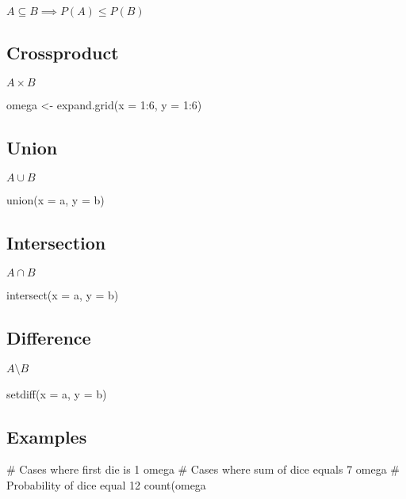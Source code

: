 $A \subseteq B \implies P(A) \leq P(B)$
\begin{multicols*}{2}
\subsection{Crossproduct}
$A \times B$
\begin{rcode}{1}
omega <- expand.grid(x = 1:6, y = 1:6)
\end{rcode}

\subsection{Union}
$A \cup B$
\begin{rcode}{1}
union(x = a, y = b)
\end{rcode}

\subsection{Intersection}
$A \cap B$
\begin{rcode}{1}
intersect(x = a, y = b)
\end{rcode}

\subsection{Difference}
$A \setminus B$
\begin{rcode}{1}
setdiff(x = a, y = b)
\end{rcode}

\subsection{Examples}
\begin{rcode}{1}
# Cases where first die is 1
omega %
# Cases where sum of dice equals 7
omega %
# Probability of dice equal 12
count(omega %
\end{rcode}
\end{multicols*}